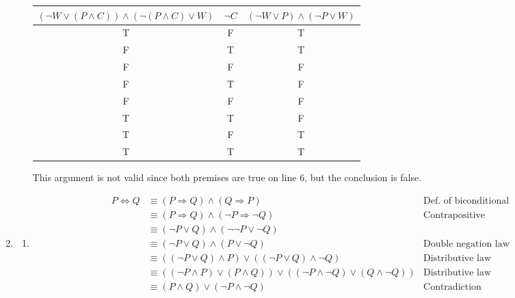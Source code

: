 \documentclass{article}
\begin{document}
\begin{enumerate}
\begin{enumerate}
    \begin{tabular}{c c c}
      $(\lnot W \lor (P \land C)) \land (\lnot (P \land C) \lor W)$ &
      $\lnot C$ &
      $(\lnot W \lor P) \land (\lnot P \lor W)$ \\ \hline
      T & F & T \\
      F & T & T \\
      F & F & F \\
      F & T & F \\
      F & F & F \\
      T & T & F \\
      T & F & T \\
      T & T & T \\
    \end{tabular}

    This argument is not valid since both premises are true on line 6, but the conclusion is false.
  \end{enumerate}
\item
  \begin{enumerate}
  \item
    \begin{equation*}
      \begin{aligned}
        P \iff Q &\equiv (P \Rightarrow Q) \land (Q \Rightarrow P) & \text{Def. of biconditional} \\
        &\equiv (P \Rightarrow Q) \land (\lnot P \Rightarrow \lnot Q) & \text{Contrapositive} \\
        &\equiv (\lnot P \lor Q) \land (\lnot \lnot P \lor \lnot Q) \\
        &\equiv (\lnot P \lor Q) \land (P \lor \lnot Q) & \text{Double negation law} \\
        &\equiv ((\lnot P \lor Q) \land P) \lor ((\lnot P \lor Q) \land \lnot Q) & \text{Distributive law} \\
        &\equiv ((\lnot P \land P) \lor (P \land Q)) \lor ((\lnot P \land \lnot Q) \lor (Q \land \lnot Q)) & \text{Distributive law} \\
        &\equiv (P \land Q) \lor (\lnot P \land \lnot Q) & \text{Contradiction}
      \end{aligned}
    \end{equation*}


\end{enumerate}
\end{enumerate}
\end{document}

